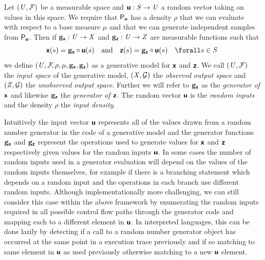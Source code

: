 \begin{definition}\label{def:generative-model}
Let $(\mathit{U},\mathcal{F})$ be a measurable space and $\boldsymbol{\mathsf{u}}: \mathit{S} \to \mathit{U}$ a random vector taking on values in this space. We require that $\mathsf{P}_{\boldsymbol{\mathsf{u}}}$ has a density $\rho$ that we can evaluate with respect to a base measure $\mu$ and that we can generate independent samples from $\mathsf{P}_{\boldsymbol{\mathsf{u}}}$. Then if ${\mathbf{g}}_{\boldsymbol{\mathsf{x}}} : \mathit{U} \to \mathit{X}$ and ${\mathbf{g}}_{\boldsymbol{\mathsf{z}}} : \mathit{U} \to \mathit{Z}$ are measurable functions such that
\begin{equation}
  \rvct{x}(s) = \genfunc_{\rvct{x}}\circ\rvct{u}(s)
  \quad\textrm{and}\quad
  \rvct{z}(s) = \genfunc_{\rvct{z}}\circ\rvct{u}(s)
  \quad \forall s \in \set{S}
\end{equation}
we define $(\mathit{U},\mathcal{F}\kern-2pt,\rho,\mu,{\mathbf{g}}_{\boldsymbol{\mathsf{x}}},{\mathbf{g}}_{\boldsymbol{\mathsf{z}}})$ as a generative model for $\boldsymbol{\mathsf{x}}$ and $\boldsymbol{\mathsf{z}}$. We call $(\mathit{U},\mathcal{F})$ the \emph{input space} of the generative model, $(\mathit{X},\mathcal{G})$ the \emph{observed output space} and $(\mathit{Z},\mathcal{G})$ the \emph{unobserved output space}. Further we will refer to ${\mathbf{g}}_{\boldsymbol{\mathsf{x}}}$ as the \emph{generator of $\boldsymbol{\mathsf{x}}$} and likewise ${\mathbf{g}}_{\boldsymbol{\mathsf{z}}}$ the \emph{generator of $\boldsymbol{\mathsf{z}}$}. The random vector $\boldsymbol{\mathsf{u}}$ is the \emph{random inputs} and the density $\rho$ the \emph{input density}.
\end{definition}

Intuitively the input vector $\boldsymbol{\mathsf{u}}$ represents all of the values drawn from a random number generator in the code of a generative model and the generator functions ${\mathbf{g}}_{\boldsymbol{\mathsf{x}}}$ and ${\mathbf{g}}_{\boldsymbol{\mathsf{z}}}$ represent the operations used to generate values for $\boldsymbol{\mathsf{x}}$ and $\boldsymbol{\mathsf{z}}$ respectively given values for the random inputs $\boldsymbol{\mathsf{u}}$. In some cases the number of random inputs used in a generator evaluation will depend on the values of the random inputs themselves, for example if there is a branching statement which depends on a random input and the operations in each branch use different random inputs. Although implementationally more challenging, we can still consider this case within the above framework by enumerating the random inputs required in all possible control flow paths through the generator code and mapping each to a different element in $\boldsymbol{\mathsf{u}}$. In interpreted languages, this can be done lazily by detecting if a call to a random number generator object  has occurred at the same point in a execution trace previously and if so matching to same element in $\boldsymbol{\mathsf{u}}$ as used previously otherwise matching to a new $\boldsymbol{\mathsf{u}}$ element.%

